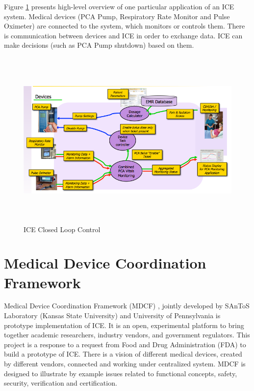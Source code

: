 Figure \ref{figure:ice} presents high-level overview of one particular application of an ICE system. Medical devices (PCA Pump, Respiratory Rate Monitor and Pulse Oximeter) are connected to the system, which monitors or controls them. There is communication between devices and ICE in order to exchange data. ICE can make decisions (such as PCA Pump shutdown) based on them.

\begin{figure}[ht]%
    \begin{center}
    	\includegraphics[height=3.5in]{figures/ice.png}   	
    \end{center}
    \caption{ICE Closed Loop Control}
    \label{figure:ice}
\end{figure}


\section{Medical Device Coordination Framework}
\label{background:mdcf}

Medical Device Coordination Framework (MDCF) \cite{MedicalApplicationPlatforms:Paper}, jointly developed by SAnToS Laboratory (Kansas State University) and University of Pennsylvania is prototype implementation of ICE. It is an open, experimental platform to bring together academic researchers, industry vendors, and government regulators. This project is a response to a request from Food and Drug Administration (FDA) to build a prototype of ICE. There is a vision of different medical devices, created by different vendors, connected and working under centralized system. MDCF is designed to illustrate by example issues related to functional concepts, safety, security, verification and certification. 

